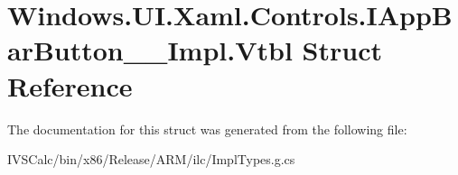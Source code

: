 \hypertarget{struct_windows_1_1_u_i_1_1_xaml_1_1_controls_1_1_i_app_bar_button_____impl_1_1_vtbl}{}\section{Windows.\+U\+I.\+Xaml.\+Controls.\+I\+App\+Bar\+Button\+\_\+\+\_\+\+Impl.\+Vtbl Struct Reference}
\label{struct_windows_1_1_u_i_1_1_xaml_1_1_controls_1_1_i_app_bar_button_____impl_1_1_vtbl}


The documentation for this struct was generated from the following file\+:\begin{DoxyCompactItemize}
\item 
I\+V\+S\+Calc/bin/x86/\+Release/\+A\+R\+M/ilc/Impl\+Types.\+g.\+cs\end{DoxyCompactItemize}

